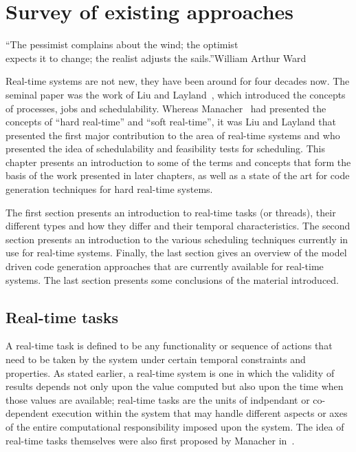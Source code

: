 \chapter{Survey of existing approaches}{``The pessimist complains
  about the wind; the optimist\\expects it to change; the realist
  adjusts the sails.''}{William Arthur Ward}
\label{chap:biblio}

Real-time systems are not new, they have been around for four decades
now. The seminal paper was the work of Liu and
Layland~\cite{liu@jacm73}, which introduced the concepts of processes,
jobs and schedulability. Whereas Manacher~\cite{manacher@jacm67} had
presented the concepts of ``hard real-time'' and ``soft real-time'',
it was Liu and Layland that presented the first major contribution to
the area of real-time systems and who presented the idea of
schedulability and feasibility tests for scheduling. This chapter
presents an introduction to some of the terms and concepts that form
the basis of the work presented in later chapters, as well as a state
of the art for code generation techniques for hard real-time systems.

The first section presents an introduction to real-time tasks (or
threads), their different types and how they differ and their temporal
characteristics. The second section presents an introduction to the
various scheduling techniques currently in use for real-time
systems. Finally, the last section gives an overview of the model
driven code generation approaches that are currently available for
real-time systems. The last section presents some conclusions of the
material introduced.

\section{Real-time tasks}
A real-time task is defined to be any functionality or sequence of
actions that need to be taken by the system under certain temporal
constraints and properties. As stated earlier, a real-time system is
one in which the validity of results depends not only upon the value
computed but also upon the time when those values are available;
real-time tasks are the units of indpendant or co-dependent execution
within the system that may handle different aspects or axes of the
entire computational responsibility imposed upon the system. The idea
of real-time tasks themselves were also first proposed by Manacher
in~\cite{manacher@jacm67}.


